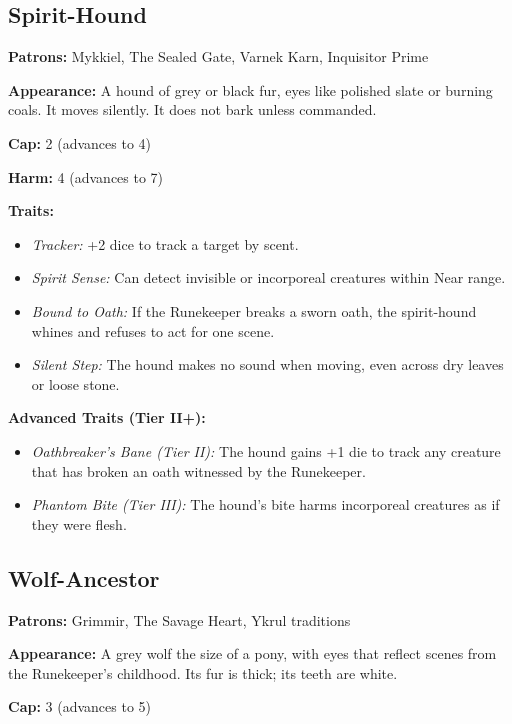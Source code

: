 \subsection{Spirit-Hound}

\noindent\textbf{Patrons:} Mykkiel, The Sealed Gate, Varnek Karn, Inquisitor Prime

\noindent\textbf{Appearance:} A hound of grey or black fur, eyes like polished slate or burning coals. It moves silently. It does not bark unless commanded.

\noindent\textbf{Cap:} 2 (advances to 4)

\noindent\textbf{Harm:} 4 (advances to 7)

\noindent\textbf{Traits:}

\begin{itemize}
\item \textit{Tracker:} +2 dice to track a target by scent.
\item \textit{Spirit Sense:} Can detect invisible or incorporeal creatures within Near range.
\item \textit{Bound to Oath:} If the Runekeeper breaks a sworn oath, the spirit-hound whines and refuses to act for one scene.
\item \textit{Silent Step:} The hound makes no sound when moving, even across dry leaves or loose stone.
\end{itemize}

\noindent\textbf{Advanced Traits (Tier II+):}
\begin{itemize}
\item \textit{Oathbreaker's Bane (Tier II):} The hound gains +1 die to track any creature that has broken an oath witnessed by the Runekeeper.
\item \textit{Phantom Bite (Tier III):} The hound's bite harms incorporeal creatures as if they were flesh.
\end{itemize}

\subsection{Wolf-Ancestor}

\noindent\textbf{Patrons:} Grimmir, The Savage Heart, Ykrul traditions

\noindent\textbf{Appearance:} A grey wolf the size of a pony, with eyes that reflect scenes from the Runekeeper's childhood. Its fur is thick; its teeth are white.

\noindent\textbf{Cap:} 3 (advances to 5)

